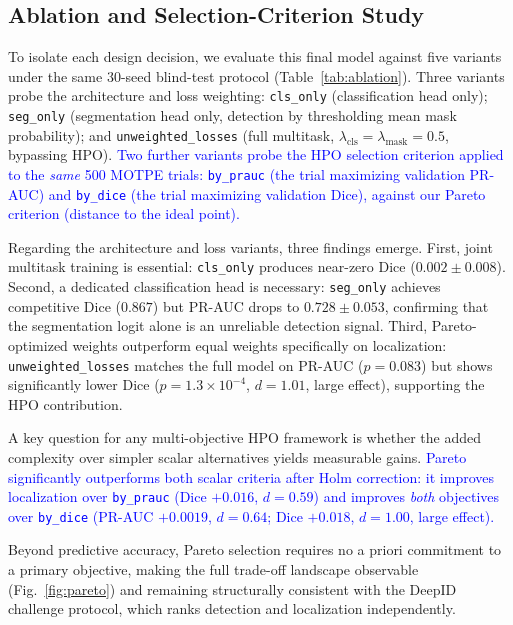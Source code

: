 \documentclass[final,5p,times,twocolumn,number]{elsarticle}
\newcommand{\rev}[1]{\textcolor{blue}{#1}}
\begin{document}
\subsection{Ablation and Selection-Criterion Study}
\label{subsec:ablation}

To isolate each design decision, we evaluate this final model against five
variants under the same 30-seed blind-test protocol
(Table~\ref{tab:ablation}). Three variants probe the architecture and loss
weighting: \texttt{cls\_only} (classification head only); \texttt{seg\_only}
(segmentation head only, detection by thresholding mean mask probability);
and \texttt{unweighted\_losses} (full multitask, $\lambda_{\text{cls}} =
\lambda_{\text{mask}} = 0.5$, bypassing HPO). \rev{Two further variants probe
the HPO selection criterion applied to the \emph{same} 500 MOTPE trials:
\texttt{by\_prauc} (the trial maximizing validation PR-AUC) and
\texttt{by\_dice} (the trial maximizing validation Dice), against our Pareto
criterion (distance to the ideal point).}

Regarding the architecture and loss variants, three findings emerge.
First, joint multitask training is essential:
\texttt{cls\_only} produces near-zero Dice ($0.002 \pm 0.008$). Second, a
dedicated classification head is necessary: \texttt{seg\_only} achieves
competitive Dice ($0.867$) but PR-AUC drops to $0.728 \pm 0.053$, confirming
that the segmentation logit alone is an unreliable detection signal. Third,
Pareto-optimized weights outperform equal weights specifically on localization:
\texttt{unweighted\_losses} matches the full model on PR-AUC ($p = 0.083$) but
shows significantly lower Dice ($p = 1.3 \times 10^{-4}$, $d = 1.01$, large
effect), supporting the HPO contribution.

A key question for any multi-objective HPO framework is whether the added
complexity over simpler scalar alternatives yields measurable gains. \rev{Pareto
significantly outperforms both scalar criteria after Holm correction:
it improves localization over \texttt{by\_prauc} (Dice $+0.016$, $d=0.59$) and
improves \emph{both} objectives over \texttt{by\_dice} (PR-AUC $+0.0019$,
$d=0.64$; Dice $+0.018$, $d=1.00$, large effect).}

Beyond predictive accuracy, Pareto selection requires no a priori commitment to a
primary objective, making the full trade-off landscape observable
(Fig.~\ref{fig:pareto}) and remaining structurally consistent with the DeepID
challenge protocol, which ranks detection and localization independently.
\end{document}
